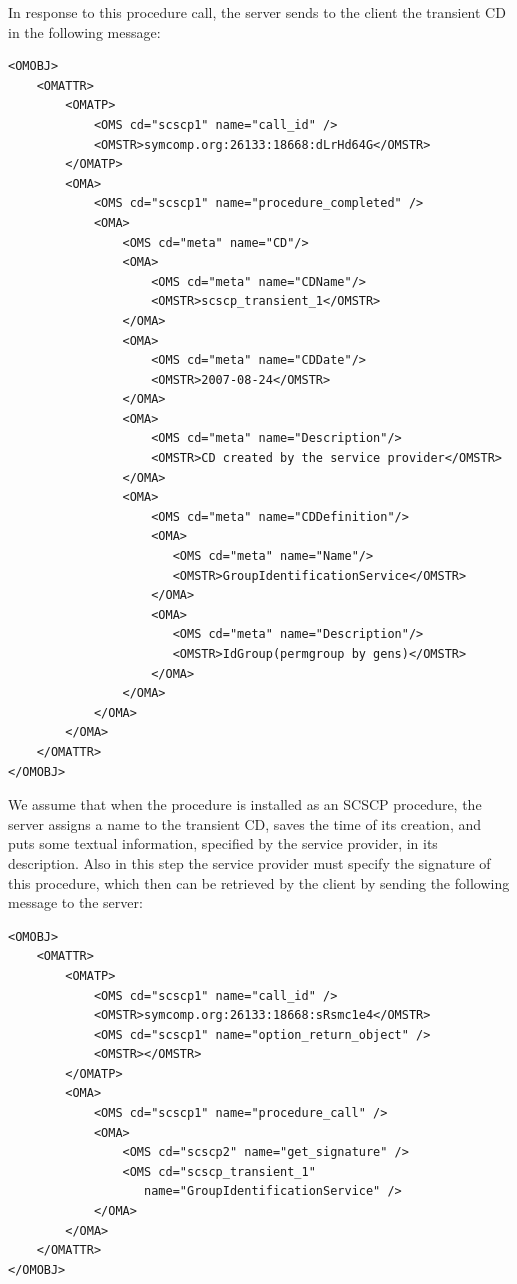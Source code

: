 \documentclass{amsart}
\begin{document}
In response to this procedure call, the server sends to the client 
the transient CD in the following message:

\begin{verbatim}
<OMOBJ>
    <OMATTR>
        <OMATP>
            <OMS cd="scscp1" name="call_id" />
            <OMSTR>symcomp.org:26133:18668:dLrHd64G</OMSTR>
        </OMATP>        
        <OMA>
            <OMS cd="scscp1" name="procedure_completed" />
            <OMA> 
                <OMS cd="meta" name="CD"/>
                <OMA>
                    <OMS cd="meta" name="CDName"/>
                    <OMSTR>scscp_transient_1</OMSTR>
                </OMA>
                <OMA>
                    <OMS cd="meta" name="CDDate"/>
                    <OMSTR>2007-08-24</OMSTR>
                </OMA>
                <OMA>
                    <OMS cd="meta" name="Description"/>
                    <OMSTR>CD created by the service provider</OMSTR>
                </OMA>
                <OMA>
                    <OMS cd="meta" name="CDDefinition"/>
                    <OMA>
                       <OMS cd="meta" name="Name"/>
                       <OMSTR>GroupIdentificationService</OMSTR>
                    </OMA>
                    <OMA>
                       <OMS cd="meta" name="Description"/>
                       <OMSTR>IdGroup(permgroup by gens)</OMSTR>
                    </OMA>
                </OMA>
            </OMA>
        </OMA>
    </OMATTR>
</OMOBJ>
\end{verbatim}

We assume that when the procedure is installed as an SCSCP procedure, the server
assigns a name to the transient CD, saves the time of its creation, and puts
some textual information, specified by the service provider, in its description.
Also in this step the service provider must specify the signature of this procedure,
which then can be retrieved by the client by sending the following message to the
server:

\begin{verbatim}
<OMOBJ>
    <OMATTR>
        <OMATP>
            <OMS cd="scscp1" name="call_id" />
            <OMSTR>symcomp.org:26133:18668:sRsmc1e4</OMSTR>
            <OMS cd="scscp1" name="option_return_object" />
            <OMSTR></OMSTR>
        </OMATP>
        <OMA>
            <OMS cd="scscp1" name="procedure_call" />
            <OMA>
                <OMS cd="scscp2" name="get_signature" />
                <OMS cd="scscp_transient_1" 
                   name="GroupIdentificationService" />
            </OMA>
        </OMA>        
    </OMATTR>
</OMOBJ>
\end{verbatim}
\end{document}
